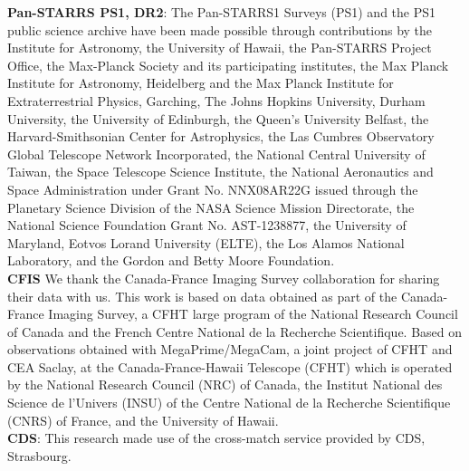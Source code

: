 \documentclass[fleqn,usenatbib]{mnras}
\begin{document}
{\bf Pan-STARRS PS1, DR2}: The Pan-STARRS1 Surveys (PS1) and the PS1 public science archive have been made possible through contributions by the Institute for Astronomy, the University of Hawaii, the Pan-STARRS Project Office, the Max-Planck Society and its participating institutes, the Max Planck Institute for Astronomy, Heidelberg and the Max Planck Institute for Extraterrestrial Physics, Garching, The Johns Hopkins University, Durham University, the University of Edinburgh, the Queen's University Belfast, the Harvard-Smithsonian Center for Astrophysics, the Las Cumbres Observatory Global Telescope Network Incorporated, the National Central University of Taiwan, the Space Telescope Science Institute, the National Aeronautics and Space Administration under Grant No. NNX08AR22G issued through the Planetary Science Division of the NASA Science Mission Directorate, the National Science Foundation Grant No. AST-1238877, the University of Maryland, Eotvos Lorand University (ELTE), the Los Alamos National Laboratory, and the Gordon and Betty Moore Foundation.\\
{\bf CFIS} We thank the Canada-France Imaging Survey collaboration for sharing their data with us. This work is based on data obtained as part of the Canada-France Imaging Survey, a CFHT large program of the National Research Council of Canada and the French Centre National de la Recherche Scientifique. Based on observations obtained with MegaPrime/MegaCam, a joint project of CFHT and CEA Saclay, at the Canada-France-Hawaii Telescope (CFHT) which is operated by the National Research Council (NRC) of Canada, the Institut National des Science de l'Univers (INSU) of the Centre National de la Recherche Scientifique (CNRS) of France, and the University of Hawaii.\\
{\bf CDS}:  This research made use of the cross-match service provided by CDS, Strasbourg.




\end{document}
